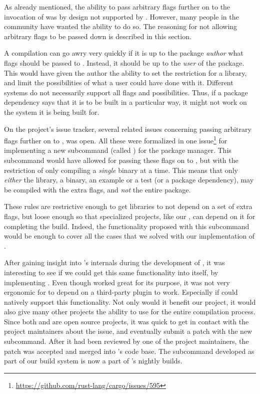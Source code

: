 As already mentioned, the ability to pass arbitrary flags further on to the invocation of {\rustc} was by design not supported by {\cargo}.
However, many people in the {\rust} community have wanted the ability to do so.
The reasoning for not allowing arbitrary flags to be passed down is described in this section.

A compilation can go awry very quickly if it is up to the package \emph{author} what flags should be passed to {\rustc}.
Instead, it should be up to the \emph{user} of the package.
This would have given the author the ability to set the restriction for a library, and limit the possibilities of what a user could have done with it.
Different systems do not necessarily support all flags and possibilities.
Thus, if a package dependency says that it is to be built in a particular way, it might not work on the system it is being built for.

On the {\cargo} project's issue tracker, several related issues concerning passing arbitrary flags further on to {\rustc}, was open.
All these were formalized in one issue\footnote{\url{https://github.com/rust-lang/cargo/issues/595}} for implementing a new subcommand (called ) for the package manager.
This subcommand would have allowed for passing these flags on to {\rustc}, but with the restriction of only compiling a \emph{single} binary at a time.
This means that only \emph{either} the library, a binary, an example or a test (or a package dependency), may be compiled with the extra flags, and \emph{not} the entire package.

These rules are restrictive enough to get libraries to not depend on a set of extra flags, but loose enough so that specialized projects, like our , can depend on it for completing the build.
Indeed, the functionality proposed with this subcommand would be enough to cover all the cases that we solved with our implementation of .

After gaining insight into {\cargo}'s internals during the development of , it was interesting to see if we could get this same functionality into {\cargo} itself, by implementing .
Even though  worked great for its purpose, it was not very ergonomic for {\rg} to depend on a third-party plugin to work.
Especially if {\cargo} could natively support this functionality.
Not only would it benefit our project, it would also give many other {\rust} projects the ability to use {\cargo} for the entire compilation process.
Since both {\rust} and {\cargo} are open source projects, it was quick to get in contact with the project maintainers about the issue, and eventually submit a patch with the new subcommand.
After it had been reviewed by one of the project maintainers, the patch was accepted and merged into {\cargo}'s code base.
The subcommand developed as part of our build system is now a part of {\rust}'s nightly builds.

